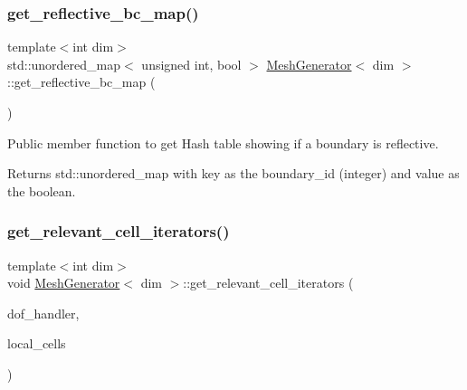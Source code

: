 \mbox{\label{class_mesh_generator_a525754e676dca1ed4ffac34f63a5d1ae}} 
\subsubsection{\texorpdfstring{get\+\_\+reflective\+\_\+bc\+\_\+map()}{get\_reflective\_bc\_map()}}
{\footnotesize\ttfamily template$<$int dim$>$ \\
std\+::unordered\+\_\+map$<$ unsigned int, bool $>$ \hyperlink{class_mesh_generator}{Mesh\+Generator}$<$ dim $>$\+::get\+\_\+reflective\+\_\+bc\+\_\+map (\begin{DoxyParamCaption}{ }\end{DoxyParamCaption})}

Public member function to get Hash table showing if a boundary is reflective.

\begin{DoxyReturn}{Returns}
std\+::unordered\+\_\+map with key as the boundary\+\_\+id (integer) and value as the boolean. 
\end{DoxyReturn}
\mbox{\label{class_mesh_generator_a0c5f845cf8476424892eb7b263672e73}} 
\subsubsection{\texorpdfstring{get\+\_\+relevant\+\_\+cell\+\_\+iterators()}{get\_relevant\_cell\_iterators()}}
{\footnotesize\ttfamily template$<$int dim$>$ \\
void \hyperlink{class_mesh_generator}{Mesh\+Generator}$<$ dim $>$\+::get\+\_\+relevant\+\_\+cell\+\_\+iterators (\begin{DoxyParamCaption}\item[{const Do\+F\+Handler$<$ dim $>$ \&}]{dof\+\_\+handler,  }\item[{std\+::vector$<$ typename Do\+F\+Handler$<$ dim $>$\+::active\+\_\+cell\+\_\+iterator $>$ \&}]{local\+\_\+cells }\end{DoxyParamCaption})}

